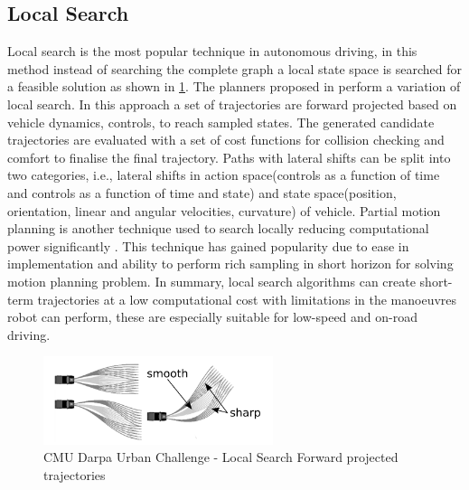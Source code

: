 \subsection{Local Search}
\label{rw_local_search}

Local search is the most popular technique in autonomous driving, in this method instead of searching the complete graph a local state space is searched for a feasible solution as shown in \ref{cmubossduc}. The planners proposed in \cite{darpa_urban_challenge} \cite{juniorstanford} \cite{kolski_thesis} \cite{Broggi2012} \cite{real_time_traj_plan_article} \cite{urbansafetyeth} perform a variation of local search. In this approach a set of trajectories are forward projected based on vehicle dynamics, controls, to reach sampled states. The generated candidate trajectories are evaluated with a set of cost functions for collision checking and comfort to finalise the final trajectory. Paths with lateral shifts can be split into two categories, i.e., lateral shifts in action space(controls as a function of time and controls as a function of time and state) and state space(position, orientation, linear and angular velocities, curvature) of vehicle\cite{howard_phd}. Partial motion planning is another technique used to search locally reducing computational power significantly \cite{partialmotionplanning}. This technique has gained popularity due to ease in implementation and ability to perform rich sampling in short horizon for solving motion planning problem. In summary, local search algorithms can create short-term trajectories at a low computational cost with limitations in the manoeuvres robot can perform, these are especially suitable for low-speed and on-road driving.

\begin{figure}
	\centering
	\includegraphics[width=0.6\textwidth]{Images/related_work/trajectorysetbossduc.png}
	\caption{CMU Darpa Urban Challenge - Local Search Forward projected trajectories}
	\label{cmubossduc}
\end{figure} 

